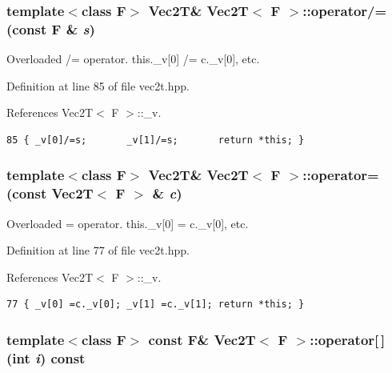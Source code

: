 \subsubsection{\setlength{\rightskip}{0pt plus 5cm}template$<$class F$>$ {\bf Vec2T}\& {\bf Vec2T}$<$ F $>$::operator/= (const F \& {\em s})\hspace{0.3cm}{\tt  [inline]}}\label{classVec2T_eb88f872395a552abe9854728f4d5eac_eb88f872395a552abe9854728f4d5eac}


Overloaded /= operator. this.\_\-v[0] /= c.\_\-v[0], etc. 

Definition at line 85 of file vec2t.hpp.

References Vec2T$<$ F $>$::\_\-v.

\footnotesize\begin{verbatim}85 { _v[0]/=s;       _v[1]/=s;       return *this; }
\end{verbatim}\normalsize 


\subsubsection{\setlength{\rightskip}{0pt plus 5cm}template$<$class F$>$ {\bf Vec2T}\& {\bf Vec2T}$<$ F $>$::operator= (const {\bf Vec2T}$<$ F $>$ \& {\em c})\hspace{0.3cm}{\tt  [inline]}}\label{classVec2T_2f8d6cda7b381d87d5b7ee7dcdeabd1c_2f8d6cda7b381d87d5b7ee7dcdeabd1c}


Overloaded = operator. this.\_\-v[0] = c.\_\-v[0], etc. 

Definition at line 77 of file vec2t.hpp.

References Vec2T$<$ F $>$::\_\-v.

\footnotesize\begin{verbatim}77 { _v[0] =c._v[0]; _v[1] =c._v[1]; return *this; }
\end{verbatim}\normalsize 


\subsubsection{\setlength{\rightskip}{0pt plus 5cm}template$<$class F$>$ const F\& {\bf Vec2T}$<$ F $>$::operator[$\,$] (int {\em i}) const\hspace{0.3cm}{\tt  [inline]}}\label{classVec2T_56bd1e633f412f07706e05b60f9eb2bc_56bd1e633f412f07706e05b60f9eb2bc}



